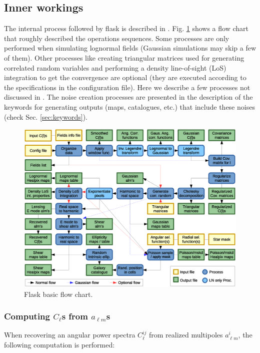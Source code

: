 \documentclass[12pt]{book} %
\begin{document}
\subsection{Inner workings}
\label{sec:workings}

The internal process followed by {\sc flask} is described in \citet{Xavier16mn}. 
Fig. \ref{fig:flow-chart} shows a flow chart that roughly described the 
operations sequences. Some processes are only performed when simulating lognormal 
fields (Gaussian simulations may skip a few of them). Other processes like 
creating triangular matrices used for generating correlated random variables and 
performing a density line-of-sight (LoS) integration to get the convergence are 
optional (they are executed according to the specifications in the configuration file).
Here we describe a few processes not discussed in \citet{Xavier16mn}. The noise 
creation processes are presented in the description of the keywords for generating 
outputs (maps, catalogues, etc.) that include these noises (check Sec. \ref{sec:keywords}).  

\begin{figure}
  \includegraphics[width=1\textwidth]{flask_flow_chart.eps}
  \caption{{\sc Flask} basic flow chart.}
\label{fig:flow-chart}  
\end{figure}

\subsubsection{Computing $C_\ell$s from $a_{\ell m}$s}

When recovering an angular power spectra $C_\ell^{ij}$ from realized multipoles $a_{\ell m}^{i}$, 
the following computation is performed:
\end{document}
